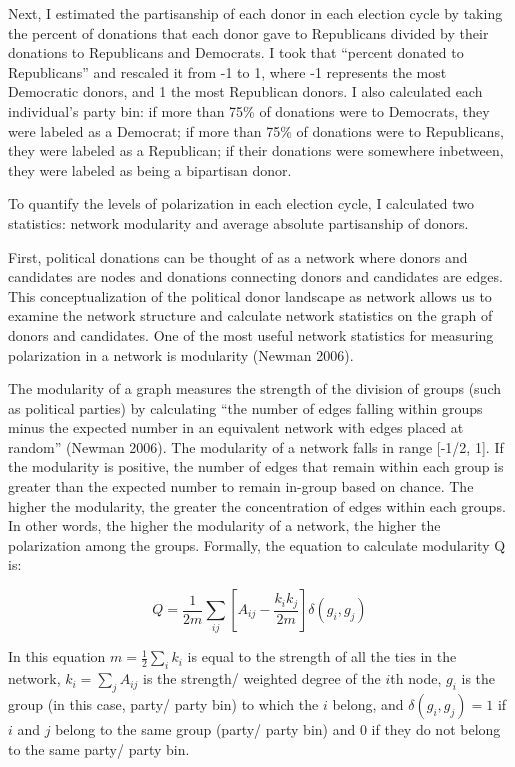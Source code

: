 \documentclass[12pt,]{article}
\begin{document}
Next, I estimated the partisanship of each donor in each election cycle
by taking the percent of donations that each donor gave to Republicans
divided by their donations to Republicans and Democrats. I took that
``percent donated to Republicans'' and rescaled it from -1 to 1, where
-1 represents the most Democratic donors, and 1 the most Republican
donors. I also calculated each individual's party bin: if more than 75\%
of donations were to Democrats, they were labeled as a Democrat; if more
than 75\% of donations were to Republicans, they were labeled as a
Republican; if their donations were somewhere inbetween, they were
labeled as being a bipartisan donor.

To quantify the levels of polarization in each election cycle, I
calculated two statistics: network modularity and average absolute
partisanship of donors.

First, political donations can be thought of as a network where donors
and candidates are nodes and donations connecting donors and candidates
are edges. This conceptualization of the political donor landscape as
network allows us to examine the network structure and calculate network
statistics on the graph of donors and candidates. One of the most useful
network statistics for measuring polarization in a network is modularity
(Newman 2006).

The modularity of a graph measures the strength of the division of
groups (such as political parties) by calculating ``the number of edges
falling within groups minus the expected number in an equivalent network
with edges placed at random'' (Newman 2006). The modularity of a network
falls in range {[}-1/2, 1{]}. If the modularity is positive, the number
of edges that remain within each group is greater than the expected
number to remain in-group based on chance. The higher the modularity,
the greater the concentration of edges within each groups. In other
words, the higher the modularity of a network, the higher the
polarization among the groups. Formally, the equation to calculate
modularity Q is:

\[Q = \frac{1}{2m} \sum_{ij}\left[A_{ij} - \frac{k_{i}k_{j}}{2m} \right]\delta(g_{i},g_{j})\]

In this equation \(m = \frac{1}{2}\sum_{i}k_{i}\) is equal to the
strength of all the ties in the network, \(k_{i}=\sum_{j}A_{ij}\) is the
strength/ weighted degree of the \(i\)th node, \(g_{i}\) is the group
(in this case, party/ party bin) to which the \(i\) belong, and
\(\delta(g_{i},g_{j}) = 1\) if \(i\) and \(j\) belong to the same group
(party/ party bin) and 0 if they do not belong to the same party/ party
bin.
\end{document}
